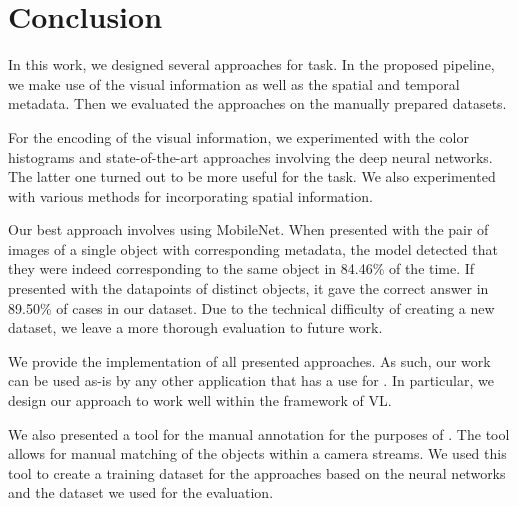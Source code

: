 \chapter*{Conclusion}

In this work, we designed several approaches for \reid{} task. In the proposed pipeline, we make use of the visual information as well as the spatial and temporal metadata. Then we evaluated the approaches on the manually prepared datasets.

For the encoding of the visual information, we experimented with the color histograms and state-of-the-art approaches involving the deep neural networks. The latter one turned out to be more useful for the \reid{} task. We also experimented with various methods for incorporating spatial information.

Our best approach involves using MobileNet. When presented with the pair of images of a single object with corresponding metadata, the model detected that they were indeed corresponding to the same object in 84.46\% of the time. If presented with the datapoints of distinct objects, it gave the correct answer in 89.50\% of cases in our dataset. Due to the technical difficulty of creating a new dataset, we leave a more thorough evaluation to future work.



We provide the implementation of all presented approaches. As such, our work can be used as-is by any other application that has a use for \reid{}. In particular, we design our approach to work well within the framework of \gls{VL}.

We also presented a tool for the manual annotation for the purposes of \reid{}. The tool allows for manual matching of the objects within a camera streams. We used this tool to create a training dataset for the approaches based on the neural networks and the dataset we used for the evaluation.


